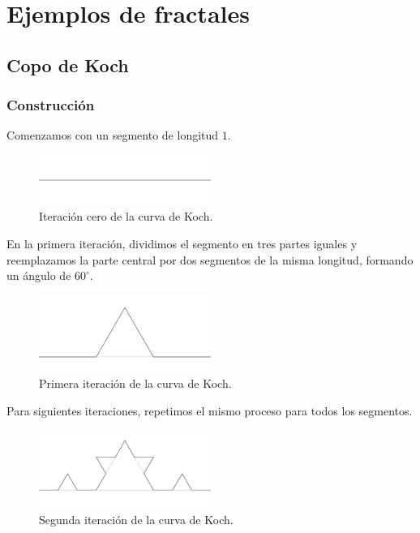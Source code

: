 \chapter{Ejemplos de fractales}

\section{Copo de Koch}

\subsection{Construcción}

\noindent Comenzamos con un segmento de longitud $1$.

\begin{figure}[H]
    \centering
    \includegraphics[width=0.5\textwidth]{figures/kock-curve-iteration-0.png}
    \caption{Iteración cero de la curva de Koch.}
    \label{fig:koch-curve-iteration-0}
\end{figure}

\noindent En la primera iteración, dividimos el segmento en tres partes iguales y reemplazamos la parte central por dos segmentos de la misma longitud, formando un ángulo de $60^\circ$. \cite{eswiki:copo-koch}

\begin{figure}[H]
    \centering
    \includegraphics[width=0.5\textwidth]{figures/kock-curve-iteration-1.png}
    \caption{Primera iteración de la curva de Koch.}
    \label{fig:koch-curve-iteration-1}
\end{figure}

\noindent Para siguientes iteraciones, repetimos el mismo proceso para todos los segmentos. \cite{eswiki:copo-koch}

\begin{figure}[H]
    \centering
    \includegraphics[width=0.5\textwidth]{figures/kock-curve-iteration-2.png}
    \caption{Segunda iteración de la curva de Koch.}
    \label{fig:koch-curve-iteration-2}
\end{figure}


